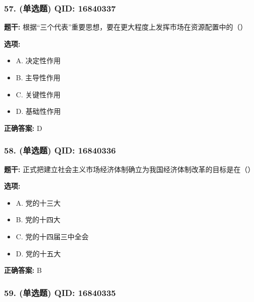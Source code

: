 \documentclass[12pt,UTF8]{ctexart}
\begin{document}
\subsubsection*{57. (单选题) \small QID: 16840337}

\textbf{题干:}
根据“三个代表”重要思想，要在更大程度上发挥市场在资源配置中的（）

\textbf{选项:}
\begin{itemize}[leftmargin=*]

  \item A. 决定性作用

  \item B. 主导性作用

  \item C. 关键性作用

  \item D. 基础性作用

\end{itemize}

\textbf{正确答案:}
D

\vspace{0.3em}\hrulefill\vspace{0.7em}

\subsubsection*{58. (单选题) \small QID: 16840336}

\textbf{题干:}
正式把建立社会主义市场经济体制确立为我国经济体制改革的目标是在（）

\textbf{选项:}
\begin{itemize}[leftmargin=*]

  \item A. 党的十三大

  \item B. 党的十四大

  \item C. 党的十四届三中全会

  \item D. 党的十五大

\end{itemize}

\textbf{正确答案:}
B

\vspace{0.3em}\hrulefill\vspace{0.7em}

\subsubsection*{59. (单选题) \small QID: 16840335}
\end{document}
